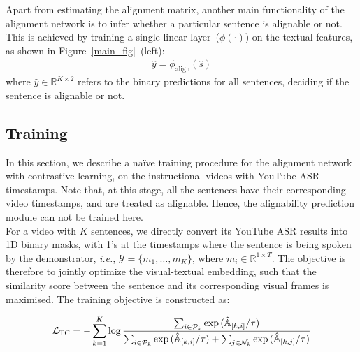 Apart from estimating the alignment matrix, 
another main functionality of the alignment network is to infer whether a particular sentence is alignable or not. 
This is achieved by training a single linear layer~($\phi(\cdot)$) on the textual features, as shown in Figure~\ref{main_fig}~(left):
\vspace{-6pt}
\vspace{-2mm}
\begin{align}
    \hat{y} = \phi_{\text{align}}(\hat{s})
\end{align}
where $\hat{y} \in \mathbb{R}^{K \times 2}$ refers to the binary predictions for all sentences, 
deciding if the sentence is alignable or not.

\subsection{Training}
\vspace{-1mm}
\label{subsec:training}
In this section, 
we describe a na\"ive training procedure for the alignment network with contrastive learning, 
on the  instructional videos with YouTube ASR timestamps.
Note that, at this stage, all the sentences have their corresponding video timestamps, and are treated as alignable. 
Hence, the alignability prediction module can not be trained here. \\[-6pt]

\vspace{-2mm}
For a video with $K$ sentences,
we directly convert its YouTube ASR results into 1D binary masks,
with 1's at the timestamps where the sentence is being spoken by the demonstrator, {\em i.e.}, $\mathcal{Y} = \{ m_1, \dots,  m_K\}$, 
where $m_i \in \mathbb{R}^{1 \times T }$.
The objective is therefore to jointly optimize the visual-textual embedding, 
such that the similarity score between the sentence and its corresponding visual frames is maximised. 
The training objective is constructed as:

\vspace{-4mm}
{\footnotesize
\begin{align}
\mathcal{L}_{\textsc{TC}} = 
- \sum_{k=1}^{K}\log{
    \frac{\sum_{i \in \mathcal{P}_k}{\exp{(\hat{\mathbb{A}}_{[k,i]} / \tau)}}}
         {{\sum_{i \in \mathcal{P}_k} {\exp{(\hat{\mathbb{A}}_{[k,i]} / \tau)}}} + 
         {\sum_{j \in \mathcal{N}_k} {\exp{(\hat{\mathbb{A}}_{[k,j]} / \tau)}}}}
         }
\label{eq:tc_loss}
\end{align}}
\vspace{-4.0mm}

